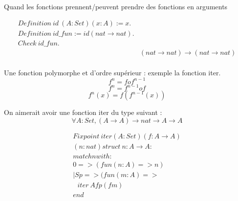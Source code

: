 \documentclass[11pt,a4paper]{article}
\begin{document}
	Quand les fonctions prennent/peuvent prendre des fonctions en arguments
	
	\begin{align*}
		Definition\ id\ (A : Set) (x : A) := x.&\\
		Definition\ id\_fun := id(nat \to nat).&\\
		Check\ id\_fun.&\\
			&(nat \to nat) \to (nat \to nat)\\
	\end{align*}
	
	Une fonction polymorphe et d'ordre supérieur : exemple la fonction iter.
	$$f^{n} = f o f^{n - 1}$$
	$$f^{n} = f^{n - 1} o f$$
	$$f^{n}(x) = f(f^{n - 1}(x))$$
	
	On aimerait avoir une fonction iter du type suivant :
	$$\forall A : Set, (A \to A) \to nat \to A \to A$$
	
	\begin{align*}
		Fixpoint\ iter (A : Set) (f : A \to A)\\
		(n : nat) {struct\ n} : A \to A :\\
		match n with :\\
		 0  => (fun(n : A) => n)\\
		|Sp => (fun(m : A) =>\\
		\ \ \ iter\ A f p (f m)\\
		end\\
	\end{align*}
	
\end{document}
